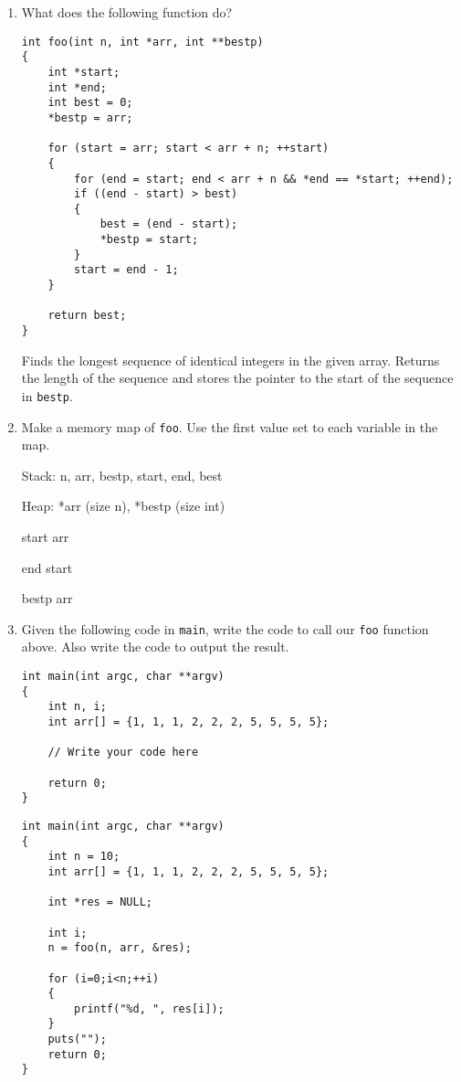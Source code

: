 %
%


\begin{enumerate}
\item What does the following function do?

\begin{lstlisting}
int foo(int n, int *arr, int **bestp)
{
	int *start;
	int *end;
	int best = 0;
	*bestp = arr;
	
	for (start = arr; start < arr + n; ++start)
	{
		for (end = start; end < arr + n && *end == *start; ++end);
		if ((end - start) > best)
		{
			best = (end - start);
			*bestp = start;
		}
		start = end - 1;
	}
	
	return best;
}
\end{lstlisting}

\begin{answer}
Finds the longest sequence of identical integers in the given array.
Returns the length of the sequence and stores the pointer to the start of the sequence in \texttt{bestp}.
\end{answer}

\item Make a memory map of \texttt{foo}. Use the first value set to each variable in the map.

\begin{answer}
Stack: n, arr, bestp, start, end, best

Heap: *arr (size n), *bestp (size int)

start \rightarrow arr

end \rightarrow start

bestp \rightarrow arr
\end{answer}

\item Given the following code in \texttt{main}, write the code to call our \texttt{foo} function above.
Also write the code to output the result.
\begin{lstlisting}[numbers=none]
int main(int argc, char **argv)
{
	int n, i;
	int arr[] = {1, 1, 1, 2, 2, 2, 5, 5, 5, 5};

	// Write your code here

	return 0;
}
\end{lstlisting}

\begin{answer}
\begin{lstlisting}
int main(int argc, char **argv)
{
	int n = 10;
	int arr[] = {1, 1, 1, 2, 2, 2, 5, 5, 5, 5};

	int *res = NULL;

	int i;
	n = foo(n, arr, &res);

	for (i=0;i<n;++i)
	{
		printf("%d, ", res[i]);
	}
	puts("");
	return 0;
}
\end{lstlisting}
\end{answer}
\end{enumerate}
